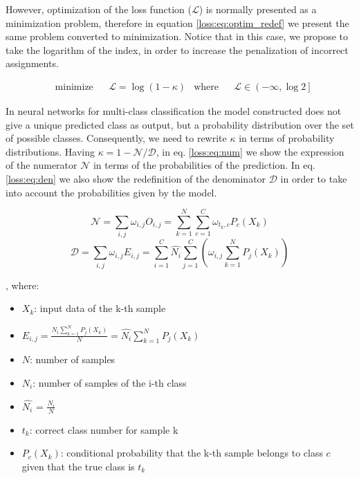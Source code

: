 However, optimization of the loss function ($\mathcal{L}$) is normally presented as a minimization problem, therefore in equation \ref{loss:eq:optim_redef} we present the same problem converted to minimization. Notice that in this case, we propose to take the logarithm of the index, in order to increase the penalization of incorrect assignments.

\begin{equation}
\label{loss:eq:optim_redef}
\begin{aligned}
& \underset{}{\text{minimize}}
& & \mathcal{L} = \log{\left( 1 - \kappa \right)}  & \text{where} & & \mathcal{L} \in \left(-\infty,\log{2}\right]
\end{aligned}
\end{equation}

In neural networks for multi-class classification the model constructed does not give a unique predicted class as output, but a probability distribution over the set of possible classes. Consequently, we need to rewrite $\kappa$ in terms of probability distributions. Having $\kappa=1-\mathcal{N}/\mathcal{D}$, in eq. \ref{loss:eq:num} we show the expression of the numerator $\mathcal{N}$ in terms of the probabilities of the prediction. In eq. \ref{loss:eq:den} we also show the redefinition of the denominator $\mathcal{D}$  in order to take into account the probabilities given by the model. 

\begin{equation}
\label{loss:eq:num}
\mathcal{N} = \sum_{i,j} \omega_{i,j} O_{i,j} = \sum_{k=1}^N \sum_{c=1}^C \omega_{t_k,c} P_c(X_k) 
\end{equation}
\begin{equation}
\label{loss:eq:den}
\mathcal{D} = \sum_{i,j} \omega_{i,j} E_{i,j} = \sum_{i=1}^C \hat{N_i} \sum_{j=1}^C \left( \omega_{i,j} \sum_{k=1}^N P_j(X_k)\right)
\end{equation}

, where:
\begin{itemize}
	\item[] $X_k$: input data of the k-th sample
	\item[] $E_{i,j} = \frac{N_i \sum_{k=1}^N P_j(X_k)}{N} = \hat{N_i} \sum_{k=1}^N P_j(X_k)$
	\item[] $N$: number of samples
	\item[] $N_i$: number of samples of the i-th class
	\item[] $\hat{N_i}$ = $\frac{N_i}{N}$	
	\item[] $t_k$: correct class number for sample k
	\item[] $P_c(X_k)$:  conditional probability that the k-th sample belongs to class $c$ given that the true class is $t_k$
\end{itemize}

